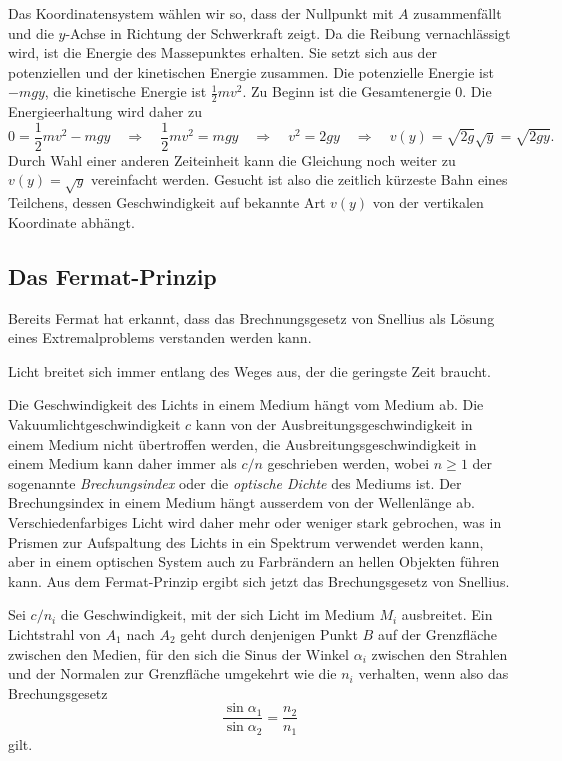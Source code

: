 Das Koordinatensystem wählen wir so, dass der Nullpunkt mit $A$ zusammenfällt
und die $y$-Achse in Richtung der Schwerkraft zeigt.
Da die Reibung vernachlässigt wird, ist die Energie des Massepunktes
erhalten.
Sie setzt sich aus der potenziellen und der kinetischen Energie
zusammen.
Die potenzielle Energie ist $-mgy$, die kinetische Energie ist
$\frac12mv^2$.
Zu Beginn ist die Gesamtenergie 0.
Die Energieerhaltung wird daher zu
\[
0=\frac12mv^2-mgy
\quad\Rightarrow\quad
\frac12mv^2=mgy
\quad\Rightarrow\quad
v^2=2gy
\quad\Rightarrow\quad
v(y)
=
\sqrt{2g}\!\sqrt{y}
=
\!\sqrt{2gy}.
\]
Durch Wahl einer anderen Zeiteinheit kann die Gleichung noch weiter zu
\(
v(y) = \sqrt{y}
\)
vereinfacht werden.
Gesucht ist also die zeitlich kürzeste Bahn eines Teilchens, 
dessen Geschwindigkeit auf bekannte Art $v(y)$ von der vertikalen
Koordinate abhängt.

%
%
\subsection{Das Fermat-Prinzip}
%
Bereits Fermat hat erkannt, dass das Brechnungsgesetz von Snellius
als Lösung eines Extremalproblems verstanden werden kann.

\begin{satz}
\label{buch:variation:problem:satz:fermat-prinzip}
Licht breitet sich immer entlang des Weges aus, der die geringste
Zeit braucht.
\end{satz}

Die Geschwindigkeit des Lichts in einem Medium hängt vom Medium ab.
Die Vakuumlichtgeschwindigkeit $c$ kann von der Ausbreitungsgeschwindigkeit
in einem Medium nicht übertroffen werden, die Ausbreitungsgeschwindigkeit
in einem Medium kann daher immer als $c/n$ geschrieben werden, wobei
$n\ge 1$ der sogenannte {\em Brechungsindex} oder die {\em optische Dichte}
des Mediums ist.
%
%
%
Der Brechungsindex in einem Medium hängt ausserdem von der Wellenlänge ab.
Verschiedenfarbiges Licht wird daher mehr oder weniger stark gebrochen,
was in Prismen zur Aufspaltung des Lichts in ein Spektrum verwendet
werden kann, aber in einem optischen System auch zu Farbrändern an
hellen Objekten führen kann.
Aus dem Fermat-Prinzip ergibt sich jetzt das Brechungsgesetz von 
Snellius.
%
%

\begin{satz}[Snellius]
\label{buch:variation:problem:satz:snellius}
Sei $c/n_i$ die Geschwindigkeit, mit der sich Licht im Medium $M_i$
ausbreitet.
Ein Lichtstrahl von $A_1$ nach $A_2$ geht durch denjenigen Punkt $B$ 
auf der Grenzfläche zwischen den Medien, für den sich die Sinus der
Winkel $\alpha_i$ zwischen den Strahlen und der Normalen zur Grenzfläche
umgekehrt wie die $n_i$ verhalten, wenn also das Brechungsgesetz
\[
\frac{\sin\alpha_1}{\sin\alpha_2}
=
\frac{n_2}{n_1}
\]
gilt.
\end{satz}

